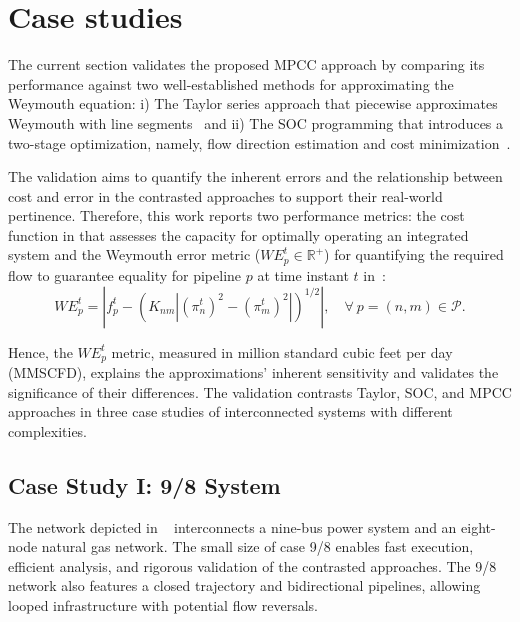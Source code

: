 \section{Case studies} \label{sec:case_study}
The current section validates the proposed MPCC approach by comparing its performance against two well-established methods for approximating the Weymouth equation: i) The Taylor series approach that piecewise approximates Weymouth with line segments~\cite{ORDOUDIS2019642} and ii) The SOC programming that introduces a two-stage optimization, namely, flow direction estimation and cost minimization~\cite{soc_paper}. 

The validation aims to quantify the inherent errors and the relationship between cost and error in the contrasted approaches to support their real-world pertinence. Therefore, this work reports two performance metrics: the cost function in  that assesses the capacity for optimally operating an integrated system and the Weymouth error metric (${WE}_p^t\in\mathbb{R}^+$) for quantifying the required flow to guarantee equality for pipeline $p$ at time instant $t$ in~:
\begin{equation}
    {WE}_p^t = \left|f_{p}^t - \left(K_{nm}|(\pi_{n}^t)^2-(\pi_{m}^t)^2|\right)^{1/2}\right| , \quad \forall \ p =(n,m) \in\mathcal{P}.
    \label{eq:weymouth_cons}
\end{equation}

\noindent Hence, the ${WE}_p^t$ metric, measured in million standard cubic feet per day (MMSCFD), explains the approximations' inherent sensitivity and validates the significance of their differences. The validation contrasts Taylor, SOC, and MPCC approaches in three case studies of interconnected systems with different complexities.

\subsection{Case Study I: 9/8 System}


The network depicted in ~\cite{Wilson_poly} interconnects a nine-bus power system and an eight-node natural gas network. The small size of case 9/8 enables fast execution, efficient analysis, and rigorous validation of the contrasted approaches. The 9/8 network also features a closed trajectory and bidirectional pipelines, allowing looped infrastructure with potential flow reversals.

